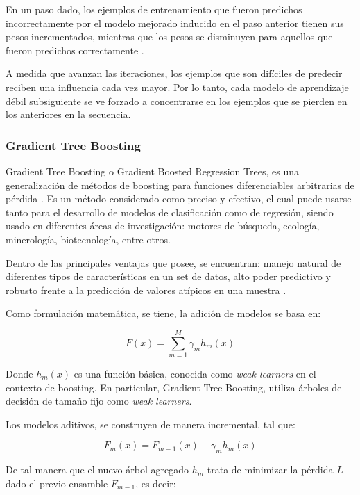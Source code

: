 En un paso dado, los ejemplos de entrenamiento que fueron predichos incorrectamente por el modelo mejorado inducido en el paso anterior tienen sus pesos incrementados, mientras que los pesos se disminuyen para aquellos que fueron predichos correctamente \cite{hastie2009multi}. 

A medida que avanzan las iteraciones, los ejemplos que son difíciles de predecir reciben una influencia cada vez mayor. Por lo tanto, cada modelo de aprendizaje débil subsiguiente se ve forzado a concentrarse en los ejemplos que se pierden en los anteriores en la secuencia.

\subsubsection{Gradient Tree Boosting}

Gradient Tree Boosting o Gradient Boosted Regression Trees, es una generalización de métodos de boosting para funciones diferenciables arbitrarias de pérdida \cite{gradient}. Es un método considerado como preciso y efectivo, el cual puede usarse tanto para el desarrollo de modelos de clasificación como de regresión, siendo usado en diferentes áreas de investigación: motores de búsqueda, ecología, minerología, biotecnología, entre otros.

Dentro de las principales ventajas que posee, se encuentran: manejo natural de diferentes tipos de características en un set de datos, alto poder predictivo y robusto frente a la predicción de valores atípicos en una muestra \cite{FRIEDMAN2002367}.

Como formulación matemática, se tiene, la adición de modelos se basa en:

\begin{equation}
	F(x) = \sum_{m=1}^{M} \gamma_m h_m(x)
\end{equation}

Donde $h_{m}(x)$ es una función básica, conocida como \textit{weak learners} en el contexto de boosting. En particular, Gradient Tree Boosting, utiliza árboles de decisión de tamaño fijo como \textit{weak learners}. 


Los modelos aditivos, se construyen de manera incremental, tal que:

\begin{equation}
	F_m(x) = F_{m-1}(x) + \gamma_m h_m(x)
\end{equation}

De tal manera que el nuevo árbol agregado $h_{m}$ trata de minimizar la pérdida $L$ dado el previo ensamble $F_{m-1}$, es decir:

